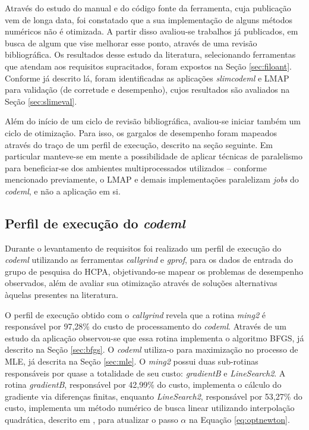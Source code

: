\documentclass[cic,tc]{iiufrgs}
\begin{document}
Através do estudo do manual e do código fonte da ferramenta, cuja publicação
vem de longa data, foi constatado que a sua implementação de alguns métodos
numéricos não é otimizada. A partir disso avaliou-se trabalhos já publicados, em
busca de algum que vise melhorar esse ponto, através de uma revisão
bibliográfica.  Os resultados desse estudo da literatura, selecionando
ferramentas que atendam aos requisitos supracitados, foram expostos na Seção
\ref{sec:filoant}. Conforme já descrito lá, foram identificadas as aplicações
\textit{slimcodeml} e LMAP para validação (de corretude e desempenho), cujos
resultados são avaliados na Seção \ref{sec:slimeval}.

Além do início de um ciclo de revisão bibliográfica, avaliou-se iniciar também
um ciclo de otimização. Para isso, os gargalos de desempenho foram mapeados
através do traço de um perfil de execução, descrito na seção seguinte. Em
particular manteve-se em mente a possibilidade de aplicar técnicas de
paralelismo para beneficiar-se dos ambientes multiprocessados utilizados --
conforme mencionado previamente, o LMAP e demais implementações paralelizam
\textit{jobs} do \textit{codeml}, e não a aplicação em si. 

\subsection{Perfil de execução do \textit{codeml}}
\label{sec:codemlpar}

Durante o levantamento de requisitos foi realizado um perfil de execução do
\textit{codeml} utilizando as ferramentas \textit{callgrind} e \textit{gprof}, para os dados de
entrada do grupo de pesquisa do HCPA, objetivando-se mapear os problemas de
desempenho observados, além de avaliar sua otimização através de soluções
alternativas àquelas presentes na literatura.

O perfil de execução obtido com o \textit{callgrind} revela que a rotina \textit{ming2}
é responsável por 97,28\% do custo de processamento do \textit{codeml}. Através de um
estudo da aplicação observou-se que essa rotina implementa o algoritmo BFGS,
já descrito na Seção \ref{sec:bfgs}. O \textit{codeml} utiliza-o para maximização no
processo de MLE, já descrita na Seção \ref{sec:mle}. O \textit{ming2} possui duas
sub-rotinas responsáveis por quase a totalidade de seu custo:
\textit{gradientB} e \textit{LineSearch2}. A rotina \textit{gradientB},
responsável por 42,99\% do custo, implementa o cálculo do gradiente via
diferenças finitas, enquanto \textit{LineSearch2}, responsável por 53,27\% do
custo, implementa um método numérico de busca linear utilizando interpolação
quadrática, descrito em \cite{wolfe1978numerical}, para atualizar o passo
$\alpha$ na Equação \ref{eq:optnewton}.
\end{document}
